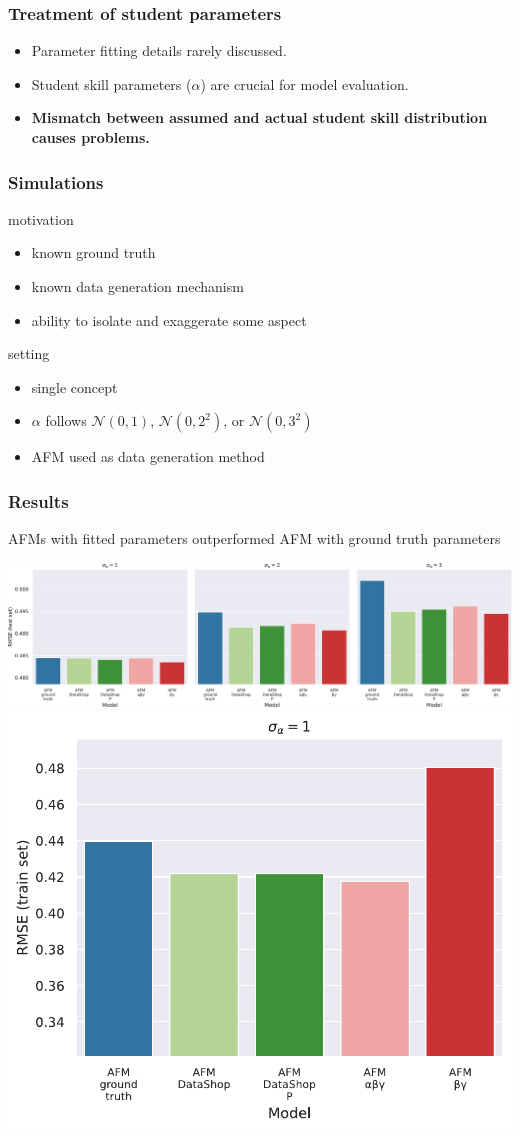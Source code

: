 \documentclass[bigger, aspectratio=169]{beamer}
\begin{document}
\begin{frame}
	\frametitle{Treatment of student parameters}
	\begin{itemize}
		\item Parameter fitting details rarely discussed.
		\item Student skill parameters ($\alpha$) are crucial for model evaluation.
		\item \textbf{Mismatch between assumed and actual student skill distribution causes problems.}
	\end{itemize}
\end{frame}


\begin{frame}
	\frametitle{Simulations}
	motivation
	\begin{itemize}
		\item known ground truth
		\item known data generation mechanism
		\item ability to isolate and exaggerate some aspect 
	\end{itemize}
		
	setting
	\begin{itemize}
		\item single concept
		\item $\alpha$ follows $\mathcal{N}(0, 1)$, $\mathcal{N}(0, 2^2)$, or $\mathcal{N}(0, 3^2)$
		\item AFM used as data generation method
	\end{itemize}
\end{frame}

\begin{frame}
	\frametitle{Results}
	AFMs with fitted parameters outperformed AFM with ground truth parameters
	
	\begin{center}
		\includegraphics[width=0.72\linewidth]{figures/rmse_test}
		\includegraphics[width=0.25\linewidth]{figures/alpha_1_beta_neg0.5_complete_random_rmse_train}
	\end{center}
\end{frame}
\end{document}
